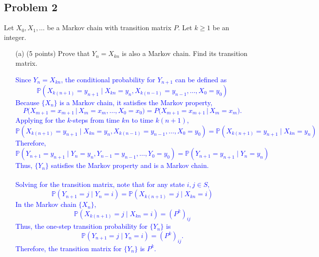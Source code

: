 \documentclass{article}
\begin{document}
\subsection*{Problem 2} Let $X_0, X_1, \dots$ be a Markov chain with transition matrix $P$. Let $k \geq 1$ be an integer.
\begin{enumerate}
    \item[(a)] (5 points) Prove that $Y_n = X_{kn}$ is also a Markov chain. Find its transition matrix.

            \textcolor{blue}{
                Since $Y_n = X_{kn}$, the conditional probability for $Y_{n+1}$ can be defined as
\[
\mathbb{P}\left(X_{k(n+1)} = y_{n+1} \mid X_{kn} = y_n, X_{k(n-1)} = y_{n-1}, \dots, X_0 = y_0\right)
\]
Because $\{X_n\}$ is a Markov chain, it satisfies the Markov property,
 \[
P\bigl(X_{m+1} = x_{m+1} \,\big\vert\, X_m = x_m, \dots, X_0 = x_0\bigr)
= P\bigl(X_{m+1} = x_{m+1} \,\big\vert\, X_m = x_m\bigr).
\]
Applying for the $k$-steps from time $kn$ to time $k(n+1)$,
\[
\mathbb{P}\left(X_{k(n+1)} = y_{n+1} \mid X_{kn} = y_n, X_{k(n-1)} = y_{n-1}, \dots, X_0 = y_0\right)
= \mathbb{P}\left(X_{k(n+1)} = y_{n+1} \mid X_{kn} = y_n\right)
\]
Therefore,
\[
\mathbb{P}\left(Y_{n+1} = y_{n+1} \mid Y_n = y_n, Y_{n-1} = y_{n-1}, \dots, Y_0 = y_0\right)
= \mathbb{P}\left(Y_{n+1} = y_{n+1} \mid Y_n = y_n\right)
\]
Thus, $\{Y_n\}$ satisfies the Markov property and is a Markov chain. \\ \\ 
Solving for the transition matrix, note that for any state $i,j \in S$,
\[
\mathbb{P}(Y_{n+1} = j \mid Y_n = i) = \mathbb{P}(X_{k(n+1)} = j \mid X_{kn} = i)
\]
In the Markov chain $\{X_n\}$, 
\[
\mathbb{P}(X_{k(n+1)} = j \mid X_{kn} = i) = (P^k)_{ij}
\]
Thus, the one-step transition probability for $\{Y_n\}$ is
\[
\mathbb{P}(Y_{n+1} = j \mid Y_n = i) = (P^k)_{ij}.
\]
Therefore, the transition matrix for $\{Y_n\}$ is $P^k$.
}
\end{enumerate}
\end{document}
